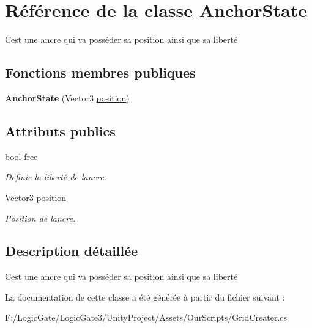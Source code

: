 \hypertarget{class_anchor_state}{}\section{Référence de la classe Anchor\+State}
\label{class_anchor_state}


C\textquotesingle{}est une ancre qui va posséder sa position ainsi que sa liberté  


\subsection*{Fonctions membres publiques}
\begin{DoxyCompactItemize}
\item 
\mbox{\label{class_anchor_state_a6f09a84b1fa65d14f5757ec975aa9bf3}} 
{\bfseries Anchor\+State} (Vector3 \mbox{\hyperlink{class_anchor_state_aedc18ef657d28aec45ad3fd88e485123}{position}})
\end{DoxyCompactItemize}
\subsection*{Attributs publics}
\begin{DoxyCompactItemize}
\item 
\mbox{\label{class_anchor_state_af84faa58def0c07ce1deae74bf137b94}} 
bool \mbox{\hyperlink{class_anchor_state_af84faa58def0c07ce1deae74bf137b94}{free}}
\begin{DoxyCompactList}\small\item\em Definie la liberté de l\textquotesingle{}ancre. \end{DoxyCompactList}\item 
\mbox{\label{class_anchor_state_aedc18ef657d28aec45ad3fd88e485123}} 
Vector3 \mbox{\hyperlink{class_anchor_state_aedc18ef657d28aec45ad3fd88e485123}{position}}
\begin{DoxyCompactList}\small\item\em Position de l\textquotesingle{}ancre. \end{DoxyCompactList}\end{DoxyCompactItemize}


\subsection{Description détaillée}
C\textquotesingle{}est une ancre qui va posséder sa position ainsi que sa liberté 

La documentation de cette classe a été générée à partir du fichier suivant \+:\begin{DoxyCompactItemize}
\item 
F\+:/\+Logic\+Gate/\+Logic\+Gate3/\+Unity\+Project/\+Assets/\+Our\+Scripts/Grid\+Creater.\+cs\end{DoxyCompactItemize}
